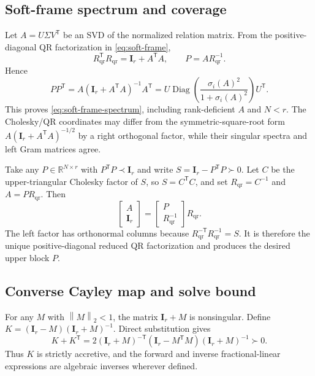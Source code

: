 \documentclass[10pt]{article}
\newcommand{\R}{\mathbb{R}}
\newcommand{\I}{\mathbf{I}}
\newcommand{\T}{\mathsf{T}}
\newcommand{\norm}[1]{\left\lVert #1 \right\rVert}
\newcommand{\diag}{\operatorname{Diag}}
\begin{document}
\subsection{Soft-frame spectrum and coverage}

Let $A=U\Sigma V^\T$ be an SVD of the normalized relation matrix.  From the
positive-diagonal QR factorization in \eqref{eq:soft-frame},
\begin{equation}
    R_{\mathrm{qr}}^\T R_{\mathrm{qr}}=\I_r+A^\T A,
    \qquad P=AR_{\mathrm{qr}}^{-1}.
\end{equation}
Hence
\begin{equation}
    PP^\T=A(\I_r+A^\T A)^{-1}A^\T
       =U\diag\!\left(
       \frac{\sigma_i(A)^2}{1+\sigma_i(A)^2}\right)U^\T.
\end{equation}
This proves \eqref{eq:soft-frame-spectrum}, including rank-deficient $A$ and
$N<r$.  The Cholesky/QR coordinates may differ from the symmetric-square-root
form $A(\I_r+A^\T A)^{-1/2}$ by a right orthogonal factor, while their singular
spectra and left Gram matrices agree.

Take any $P\in\R^{N\times r}$ with $P^\T P\prec\I_r$ and write
$S=\I_r-P^\T P\succ0$.  Let $C$ be the upper-triangular Cholesky factor of
$S$, so $S=C^\T C$, and set $R_{\mathrm{qr}}=C^{-1}$ and
$A=PR_{\mathrm{qr}}$.  Then
\begin{equation}
    \begin{bmatrix}A\\\I_r\end{bmatrix}
    =
    \begin{bmatrix}P\\R_{\mathrm{qr}}^{-1}\end{bmatrix}R_{\mathrm{qr}}.
\end{equation}
The left factor has orthonormal columns because
$R_{\mathrm{qr}}^{-\T}R_{\mathrm{qr}}^{-1}=S$.  It is therefore the unique
positive-diagonal reduced QR factorization and produces the desired upper
block $P$.

\subsection{Converse Cayley map and solve bound}

For any $M$ with $\norm{M}_2<1$, the matrix $\I_r+M$ is nonsingular.  Define
$K=(\I_r-M)(\I_r+M)^{-1}$.  Direct substitution gives
\begin{equation}
    K+K^\T
    =2(\I_r+M)^{-\T}(\I_r-M^\T M)(\I_r+M)^{-1}\succ0.
\end{equation}
Thus $K$ is strictly accretive, and the forward and inverse
fractional-linear expressions are algebraic inverses wherever defined.
\end{document}
